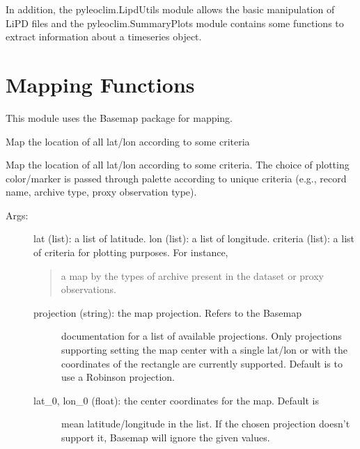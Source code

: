 \documentclass[letterpaper,10pt,english]{sphinxmanual}
\begin{document}
In addition, the pyleoclim.LipdUtils module allows the basic manipulation of LiPD files and the pyleoclim.SummaryPlots module
contains some functions to extract information about a timeseries object.


\chapter{Mapping Functions}
\label{\detokenize{Map:mapping-functions}}\label{\detokenize{Map::doc}}
This module uses the Basemap package for mapping.

\begin{fulllineitems}
\label{\detokenize{Map:pyleoclim.Map.mapAll}}
Map the location of all lat/lon according to some criteria

Map the location of all lat/lon according to some criteria. The choice of 
plotting color/marker is passed through palette according to unique 
criteria (e.g., record name, archive type, proxy observation type).
\begin{description}
\item[{Args:}] \leavevmode
lat (list): a list of latitude.
lon (list): a list of longitude.
criteria (list): a list of criteria for plotting purposes. For instance,
\begin{quote}

a map by the types of archive present in the dataset or proxy
observations.
\end{quote}
\begin{description}
\item[{projection (string): the map projection. Refers to the Basemap}] \leavevmode
documentation for a list of available projections. Only projections
supporting setting the map center with a single lat/lon or with
the coordinates of the rectangle are currently supported. 
Default is to use a Robinson projection.

\item[{lat\_0, lon\_0 (float): the center coordinates for the map. Default is}] \leavevmode
mean latitude/longitude in the list. 
If the chosen projection doesn’t support it, Basemap will
ignore the given values.


\end{description}
\end{description}
\end{fulllineitems}
\end{document}
